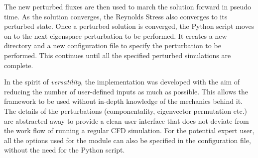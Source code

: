 The new perturbed fluxes are then used to march the solution forward in pseudo time. As the solution converges, the Reynolds Stress also converges to its perturbed state. Once a perturbed solution is converged, the Python script moves on to the next eigenspace perturbation to be performed. It creates a new directory and a new configuration file to specify the perturbation to be performed. This continues until all the specified perturbed simulations are complete. 

In the spirit of \textit{versatility}, the implementation was developed with the aim of reducing the number of user-defined inputs as much as possible. This allows the framework to be used without in-depth knowledge of the mechanics behind it. The details of the perturbations (componentality, eigenvector permutation etc.) are abstracted away to provide a clean user interface that does not deviate from the work flow of running a regular CFD simulation. For the potential expert user, all the options used for the module can also be specified in the configuration file, without the need for the Python script. 